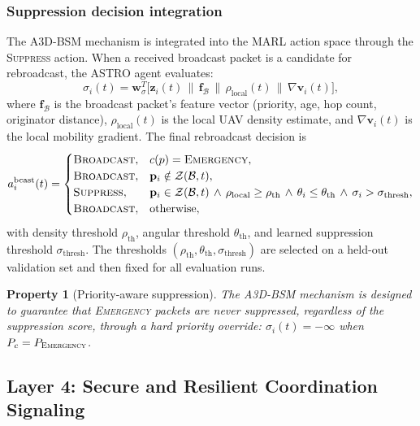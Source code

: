 \documentclass[5p,times]{elsarticle}
\newtheorem{property}{Property}[section]
\begin{document}
\subsubsection{Suppression decision integration}

The A3D-BSM mechanism is integrated into the MARL action space through the \textsc{Suppress} action. When a received broadcast packet is a candidate for rebroadcast, the ASTRO agent evaluates:
\begin{equation}
\label{eq:suppress_score}
\sigma_i(t) = \mathbf{w}_\sigma^T \big[\mathbf{z}_i(t) \,\|\, \mathbf{f}_{\mathcal{B}} \,\|\, \rho_{\mathrm{local}}(t) \,\|\, \nabla\mathbf{v}_i(t)\big],
\end{equation}
where $\mathbf{f}_{\mathcal{B}}$ is the broadcast packet's feature vector (priority, age, hop count, originator distance), $\rho_{\mathrm{local}}(t)$ is the local UAV density estimate, and $\nabla\mathbf{v}_i(t)$ is the local mobility gradient. The final rebroadcast decision is
\begin{equation}
\label{eq:broadcast_rule}
a_i^{\mathrm{bcast}}(t)=
\begin{cases}
\textsc{Broadcast}, & c(p)=\textsc{Emergency},\\
\textsc{Broadcast}, & \mathbf{p}_i\notin\mathcal{Z}(\mathcal{B},t),\\
\textsc{Suppress}, & \mathbf{p}_i\in\mathcal{Z}(\mathcal{B},t)\,\wedge\,\rho_{\mathrm{local}}\ge\rho_{\mathrm{th}}\,\wedge\,\theta_i\le\theta_{\mathrm{th}}\,\wedge\,\sigma_i>\sigma_{\mathrm{thresh}},\\
\textsc{Broadcast}, & \text{otherwise},
\end{cases}
\end{equation}
with density threshold $\rho_{\mathrm{th}}$, angular threshold $\theta_{\mathrm{th}}$, and learned suppression threshold $\sigma_{\mathrm{thresh}}$.
The thresholds $(\rho_{\mathrm{th}},\theta_{\mathrm{th}},\sigma_{\mathrm{thresh}})$ are selected on a held-out validation set and then fixed for all evaluation runs.

\begin{property}[Priority-aware suppression]
\label{prop:priority_suppress}
The A3D-BSM mechanism is designed to guarantee that \textsc{Emergency} packets are never suppressed, regardless of the suppression score, through a hard priority override: $\sigma_i(t) = -\infty$ when $P_c = P_{\textsc{Emergency}}$.
\end{property}

\subsection{Layer 4: Secure and Resilient Coordination Signaling}
\label{subsec:security}
\end{document}

